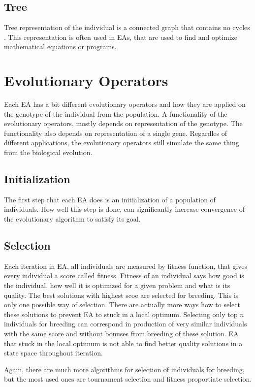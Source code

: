 \subsection{Tree}
Tree representation of the individual is a connected graph that contains no cycles \cite{tree-definition}. This representation is often used in EAs, that are used to find and optimize mathematical equations or programs.

\section{Evolutionary Operators}
Each EA has a bit different evolutionary operators and how they are applied on the genotype of the individual from the population. A functionality of the evolutionary operators,  mostly depends on representation of the genotype. The functionality also depends on representation of a single gene. Regardles of different applications, the evolutionary operators still simulate the same thing from the biological evolution.

\subsection{Initialization}
The first step that each EA does is an initialization of a population of individuals. How well this step is done, can significantly increase convergence of the evolutionary algorithm to satisfy its goal.

\subsection{Selection}
Each iteration in EA, all individuals are measured by fitness function, that gives every individual a score called fitness. Fitness of an individual says how good is the individual, how well it is optimized for a given problem and what is its quality. The best solutions with highest scoe are selected for breeding. This is only one possible way of selection. There are actually more ways how to select these solutions to prevent EA to stuck in a local optimum. Selecting only top $n$ individuals for breeding can correspond in production of very similar individuals with the same score and without bonuses from breeding of these solution. EA that stuck in the local optimum is not able to find better quality solutions in a state space throughout iteration.

Again, there are much more algorithms for selection of individuals for breeding, but the most used ones are tournament selection and fitness proportiate selection.

